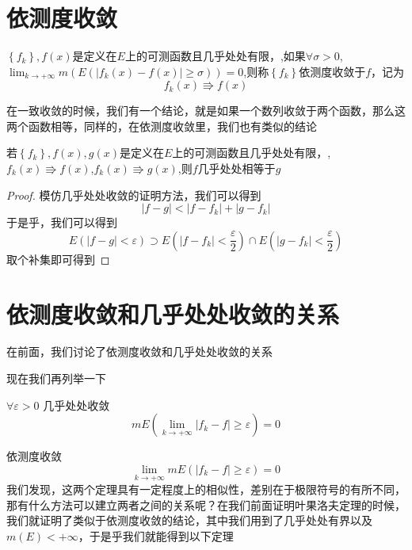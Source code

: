\documentclass[lang=cn,14pt]{elegantbook}
\begin{document}
	\section{依测度收敛}
	\begin{definition}
		$\left\{ f_k \right\} ,f\left( x \right) \text{是定义在}E\text{上的可测函数且几乎处处有限，}$,如果$\forall \sigma>0 $,$\lim_{k\rightarrow +\infty} m\left( E\left( |f_k\left( x \right) -f\left( x \right) |\ge \sigma \right) \right) =0
		$,则称$\left\{ f_k \right\}$依测度收敛于$f$，记为
		\begin{equation*}
			f_k\left( x \right) \Rrightarrow f\left( x \right) 
		\end{equation*}
	\end{definition}
	在一致收敛的时候，我们有一个结论，就是如果一个数列收敛于两个函数，那么这两个函数相等，同样的，在依测度收敛里，我们也有类似的结论
	\begin{theorem}
		若$\left\{ f_k \right\} ,f\left( x \right),g(x) \text{是定义在}E\text{上的可测函数且几乎处处有限，}$,$f_k\left( x \right) \Rrightarrow f\left( x \right)$,$f_k\left( x \right) \Rrightarrow g\left( x \right)$,则$f$几乎处处相等于$g$
	\end{theorem}
	\begin{proof}
		模仿几乎处处收敛的证明方法，我们可以得到
		\begin{equation*}
			|f-g|<|f-f_k|+|g-f_k|
		\end{equation*}
		于是乎，我们可以得到
		\begin{equation*}
			E\left( |f-g|<\varepsilon \right) \supset E\left( |f-f_k|<\frac{\varepsilon}{2} \right) \cap E\left( |g-f_k|<\frac{\varepsilon}{2} \right) 
		\end{equation*}
		取个补集即可得到
	\end{proof}
	\section{依测度收敛和几乎处处收敛的关系}
	在前面，我们讨论了依测度收敛和几乎处处收敛的关系
	
	现在我们再列举一下
	
	$\forall \varepsilon>0$
	几乎处处收敛
    \begin{equation*}
    	mE\left( \lim_{k\rightarrow +\infty} |f_k-f|\ge \varepsilon\right) =0
    \end{equation*}
    
    依测度收敛
   \begin{equation*}
   	\lim_{k\rightarrow +\infty} mE\left( |f_k-f|\ge \varepsilon \right) =0
   \end{equation*}
   我们发现，这两个定理具有一定程度上的相似性，差别在于极限符号的有所不同，那有什么方法可以建立两者之间的关系呢？在我们前面证明叶果洛夫定理的时候，我们就证明了类似于依测度收敛的结论，其中我们用到了几乎处处有界以及$m(E)<+\infty$，于是乎我们就能得到以下定理
   
\end{document}
